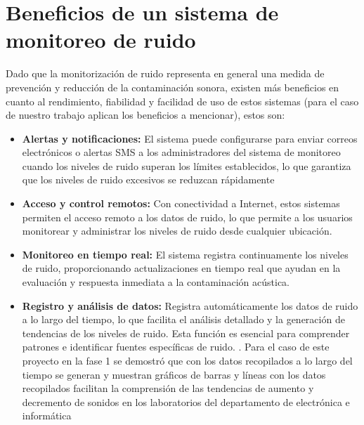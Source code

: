 {{\section{Beneficios de un sistema de monitoreo de ruido}

Dado que la monitorización de ruido representa en general una medida de prevención y reducción de la contaminación sonora, existen más beneficios en cuanto al rendimiento, fiabilidad y facilidad de uso de estos sistemas (para el caso de nuestro trabajo aplican los beneficios a mencionar), estos son: 

\begin{itemize}

    \item \textbf{Alertas y notificaciones:} El sistema puede configurarse para enviar correos electrónicos o alertas SMS a los administradores del sistema de monitoreo cuando los niveles de ruido superan los límites establecidos, lo que garantiza que los niveles de ruido excesivos se reduzcan rápidamente \parencite{AdvanceTech2024}
    \vspace{1cm}
    \item \textbf{Acceso y control remotos:} Con conectividad a Internet, estos sistemas permiten el acceso remoto a los datos de ruido, lo que permite a los usuarios monitorear y administrar los niveles de ruido desde cualquier ubicación. \parencite{AdvanceTech2024}
    \vspace{1cm}
    \item \textbf{Monitoreo en tiempo real:} El sistema registra continuamente los niveles de ruido, proporcionando actualizaciones en tiempo real que ayudan en la evaluación y respuesta inmediata a la contaminación acústica. \parencite{AdvanceTech2024}
    \vspace{1cm}
    \item \textbf{Registro y análisis de datos:} Registra automáticamente los datos de ruido a lo largo del tiempo, lo que facilita el análisis detallado y la generación de tendencias de los niveles de ruido. Esta función es esencial para comprender patrones e identificar fuentes específicas de ruido. \parencite{AdvanceTech2024}. Para el caso de este proyecto en la fase 1 se demostró que con los datos recopilados a lo largo del tiempo se generan y muestran gráficos de barras y líneas con los datos recopilados facilitan la comprensión de las tendencias de aumento y decremento de sonidos en los laboratorios del departamento de electrónica e informática \parencite{carpio2025}
    

\end{itemize}}}
